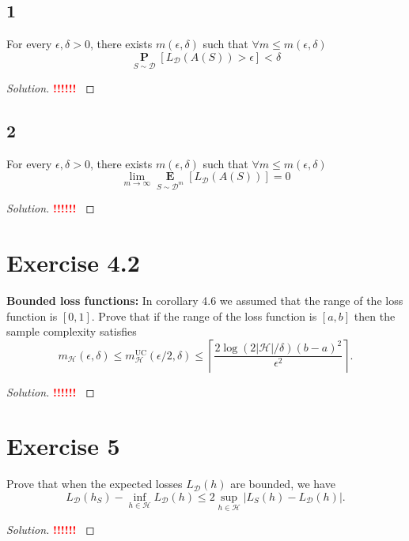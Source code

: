 \documentclass[10pt, a4paper, twoside]{amsart}
\renewcommand{\P}{\operatorname*{\ensuremath{\mathbf{P}}}}
\newcommand{\Ev}{\operatorname*{\ensuremath{\mathbf{E}}}}
\newenvironment{solution}
               {\let\oldqedsymbol=\qedsymbol
                \renewcommand{\qedsymbol}{$\blacktriangleleft$}
                \begin{proof}[Solution]}
               {\end{proof}
                \renewcommand{\qedsymbol}{\oldqedsymbol}}
\newcommand{\TODO}{\textcolor{red}{\textbf{!!!!!! }}}
\begin{document}
\subsection*{1}
For every $\epsilon , \delta > 0$, there exists $m(\epsilon , \delta)$ such that $\forall m \leq m(\epsilon , \delta)$
\begin{equation*}
\P_{S \sim \mathcal{D}}[L_{\mathcal{D}}(A(S))>\epsilon]<\delta
\end{equation*}
\begin{solution}
  \TODO
\end{solution}

\subsection*{2}
For every $\epsilon , \delta > 0$, there exists $m(\epsilon , \delta)$ such that $\forall m \leq m(\epsilon , \delta)$
\begin{equation*}
\lim_{m\to \infty}\Ev_{S\sim \mathcal{D}^{m}}[L_{\mathcal{D}}(A(S))] =0
\end{equation*}
\begin{solution}
  \TODO
\end{solution}

\section*{Exercise 4.2}
\textbf{Bounded loss functions:}
In corollary 4.6 we assumed that the range of the loss function is $[0,1]$. Prove that if the range of the loss function is $[a,b]$ then the sample complexity satisfies
\begin{equation*}
  m_{\mathcal{H}}(\epsilon , \delta) \leq m_{\mathcal{H}}^{\text{UC}}(\epsilon /2, \delta)
  \leq \left\lceil \frac{2\log (2|\mathcal{H}|/\delta) (b-a)^2}{\epsilon^2} \right\rceil .
\end{equation*}
\begin{solution}
  \TODO
\end{solution}

\section*{Exercise 5}
Prove that when the expected losses $L_{\mathcal{D}}(h)$ are bounded, we have
\begin{equation*}
  L_{\mathcal{D}}(h_S) - \inf_{h\in \mathcal{H}}L_{\mathcal{D}}(h)
  \leq 2 \sup_{h\in \mathcal{H}}|L_S(h)-L_{\mathcal{D}}(h)|.
\end{equation*}
\begin{solution}
  \TODO
\end{solution}
\end{document}
